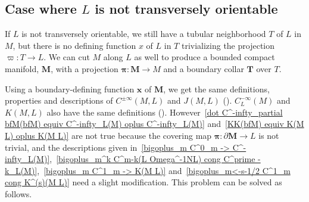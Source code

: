 \documentclass{memo-l}
\theoremstyle{plain}
\theoremstyle{definition}
\theoremstyle{remark}
\newcommand{\bfx}{\boldsymbol{x}}
\newcommand{\bfM}{\boldsymbol{M}}
\newcommand{\bfT}{\boldsymbol{T}}
\newcommand{\bfpi}{\boldsymbol{\pi}}
\numberwithin{section}{chapter}
\numberwithin{equation}{section}%
\begin{document}
\subsection{Case where $L$ is not transversely orientable}\label{ss: case where L is not transversely orientable}

If $L$ is not transversely orientable, we still have a tubular neighborhood $T$ of $L$ in $M$, but there is no defining function $x$ of $L$ in $T$ trivializing the projection $\varpi:T\to L$. We can cut $M$ along $L$ as well to produce a bounded compact manifold, $\bfM$, with a projection $\bfpi:\bfM\to M$ and a boundary collar $\bfT$ over $T$.

Using a boundary-defining function $\bfx$ of $\bfM$, we get the same definitions, properties and descriptions of $C^{\pm\infty}(M,L)$ and $J(M,L)$ (). $C^{-\infty}_L(M)$ and $K(M,L)$ also have the same definitions (). However~\eqref{dot C^-infty_partial bfM(bfM) equiv C^-infty_L(M) oplus C^-infty_L(M)} and~\eqref{KK(bfM) equiv K(M L) oplus K(M L)} are not true because the covering map $\bfpi:\partial\bfM\to L$ is not trivial, and the descriptions given in~\eqref{bigoplus_m C^0_m -> C^-infty_L(M)},~\eqref{bigoplus_m^k C^m-k(L Omega^-1NL) cong C^prime -k_L(M)},~\eqref{bigoplus_m C^1_m -> K(M L)} and~\eqref{bigoplus_m<-s-1/2 C^1_m cong K^(s)(M L)} need a slight modification. This problem can be solved as follows.
\end{document}
